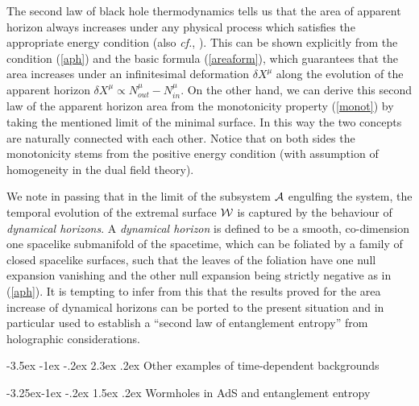 \documentclass[12pt]{article}
\makeatletter
\renewcommand\section{\@startsection {section}{1}{\z@}%
                                   {-3.5ex \@plus -1ex \@minus -.2ex}%
                                   {2.3ex \@plus.2ex}%
                                   {\normalfont\large\bfseries}}
\renewcommand\subsection{\@startsection{subsection}{2}{\z@}%
                                     {-3.25ex\@plus -1ex \@minus -.2ex}%
                                     {1.5ex \@plus .2ex}%
                                     {\normalfont\bfseries}}
\def\req#1{(\ref{#1})}
\def\cf{{\it cf.}}
\def\CA{{\cal A}}
\def\CW{{\cal W}}
\def\Gms{\CW}
\def\rA{\CA}
\makeatother
\begin{document}
The second law of black hole thermodynamics tells us that the area
of apparent horizon  always increases under any physical process
which satisfies the appropriate energy condition \cite{Hawking:1973uf} (also \cf,
\cite{Ashtekar:2004cn}). This can be shown explicitly from the
condition \req{aph} and the basic formula \req{areaform}, which
guarantees that the area increases under an infinitesimal
deformation $\delta X^\mu$ along the evolution of the apparent
horizon $\delta X^\mu\propto N_{out}^\mu-N_{in}^\mu$. On the other
hand, we can derive this second law of the apparent horizon area
from the monotonicity property \req{monot} by taking the mentioned
limit of the minimal surface. In this way the two concepts are
naturally connected with each other. Notice that on both sides the
monotonicity stems from the positive energy condition (with assumption of 
homogeneity in the dual field theory).

We note in passing that in the limit of the subsystem $\rA$ engulfing the system,
the temporal evolution of the extremal surface $\Gms$ is captured by the behaviour of {\em dynamical horizons}. A {\em dynamical horizon} is defined to be a smooth, co-dimension one spacelike submanifold of the spacetime, which can be foliated by a family of closed spacelike surfaces, such that the leaves of the foliation have one null expansion vanishing and the other null expansion being strictly negative \cite{Ashtekar:2003hk,Ashtekar:2004cn} as in \req{aph}. It is tempting to infer from this that the results proved for the area increase of dynamical horizons can be ported to the present situation and in particular used to establish a ``second law of entanglement entropy'' from holographic considerations.

\section{Other examples of time-dependent backgrounds}
\label{wholebub}

\subsection{Wormholes in AdS and entanglement entropy}
\end{document}
